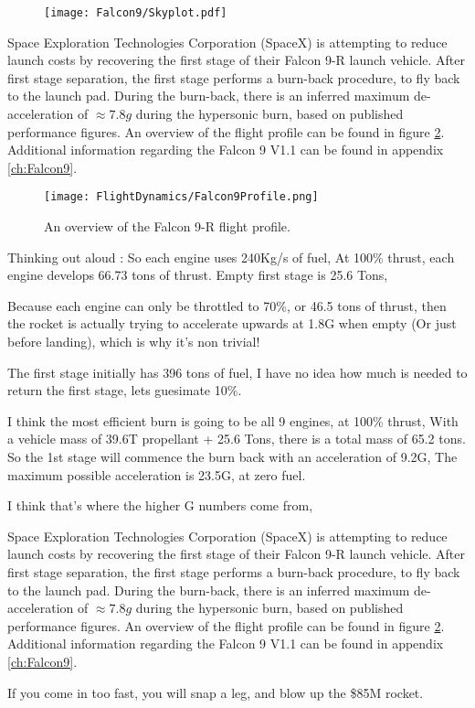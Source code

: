 \begin{figure}[!htb] 
    \centering
    \texttt{[image: Falcon9/Skyplot.pdf]}
    \caption{}
    \label{fig:Skyplot}
\end{figure}



Space Exploration Technologies Corporation (SpaceX) is attempting to reduce launch costs by recovering the first stage of their Falcon 9-R launch vehicle. After first stage separation, the first stage performs a burn-back procedure, to fly back to the launch pad. During the burn-back, there is an inferred maximum de-acceleration of $\approx 7.8 g$ during the hypersonic burn, based on published performance figures. An overview of the flight profile can be found in figure \ref{fig:Falcon9Profile}. Additional information regarding the Falcon 9 V1.1 can be found in appendix \ref{ch:Falcon9}.

\begin{figure}[!htb] 
    \centering
    \texttt{[image: FlightDynamics/Falcon9Profile.png]} 
    \caption{An overview of the Falcon 9-R flight profile.}
    \label{fig:Falcon9Profile}
\end{figure}



Thinking out aloud : 
So each engine uses 240Kg/s of fuel,
At 100\% thrust, each engine develops 66.73 tons of thrust.
Empty first stage is 25.6 Tons,

Because each engine can only be throttled to 70\%, or 46.5 tons of thrust, then the rocket is actually trying to accelerate upwards at 1.8G when empty (Or just before landing), which is why it's non trivial!

The first stage initially has 396 tons of fuel, I have no idea how much is needed to return the first stage, lets guesimate 10\%.

I think the most efficient burn is going to be all 9 engines, at 100\% thrust, 
With a vehicle mass of 39.6T propellant + 25.6 Tons, there is a total mass of 65.2 tons.
So the 1st stage will commence the burn back with an acceleration of 9.2G, The maximum possible acceleration is 23.5G, at zero fuel.

I think that's where the higher G numbers come from,


Space Exploration Technologies Corporation (SpaceX) is attempting to reduce launch costs by recovering the first stage of their Falcon 9-R launch vehicle. After first stage separation, the first stage performs a burn-back procedure, to fly back to the launch pad. During the burn-back, there is an inferred maximum de-acceleration of $\approx 7.8 g$ during the hypersonic burn, based on published performance figures. An overview of the flight profile can be found in figure \ref{fig:Falcon9Profile}. Additional information regarding the Falcon 9 V1.1 can be found in appendix \ref{ch:Falcon9}.

If you come in too fast, you will snap a leg, and blow up the \$85M rocket. 